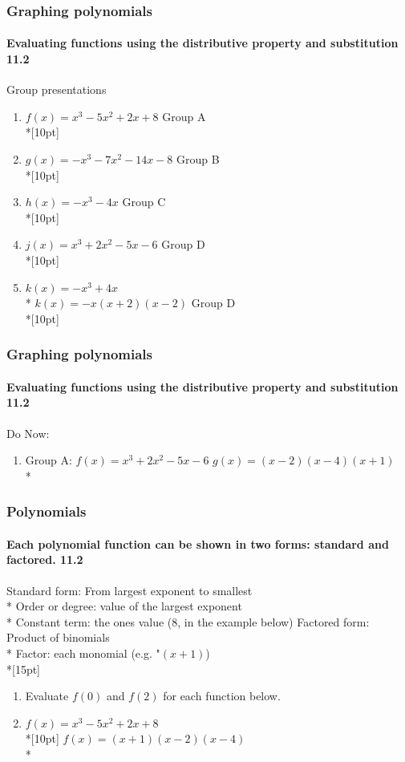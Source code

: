 \documentclass{beamer}
\begin{document}
\frame
{
  \frametitle{Graphing polynomials}
  \framesubtitle{Evaluating functions using the distributive property and substitution \qquad \qquad \qquad \alert{11.2}}

  \begin{block}{Group presentations}
  \begin{enumerate}
      \item $f(x)=x^3-5x^2+2x+8$ \qquad Group A\\*[10pt]
      \item $g(x)=-x^3-7x^2-14x-8$ \qquad Group B\\*[10pt]
      \item $h(x)=-x^3-4x$ \qquad \qquad \qquad Group C\\*[10pt]
      \item $j(x)=x^3+2x^2-5x-6$ \qquad Group D\\*[10pt]
      \item $k(x)=-x^3+4x$\\*
      $k(x)=-x(x+2)(x-2)$ \qquad Group D\\*[10pt]

  \end{enumerate}
  \end{block}
}
\frame
{
  \frametitle{Graphing polynomials}
  \framesubtitle{Evaluating functions using the distributive property and substitution \qquad \qquad \qquad \alert{11.2}}

  \begin{block}{Do Now: }
  \begin{enumerate}
      \item Group A:       $f\left(x\right)=x^3+2x^2-5x-6$
      $g\left(x\right)=\left(x-2\right)\left(x-4\right)\left(x+1\right)$\\*

  \end{enumerate}
  \end{block}
}

\frame
{
  \frametitle{Polynomials}
  \framesubtitle{Each polynomial function can be shown in two forms: standard and factored. \qquad \qquad \qquad \alert{11.2}}
\alert{Standard form}: From largest exponent to smallest\\*
\qquad \alert{Order or degree}: value of the largest exponent\\*
\qquad \alert{Constant term}: the ones value (8, in the example below)
\alert{Factored form}: Product of binomials\\*
\qquad \alert{Factor}: each monomial (e.g. "$(x+1)$)\\*[15pt]
  \begin{enumerate}
    \item Evaluate $f(0)$ and $f(2)$ for each function below.
      \item $f(x)=x^3-5x^2+2x+8$ \qquad \\*[10pt]
      $f(x)=(x+1)(x-2)(x-4)$\\*

  \end{enumerate}
}
\end{document}

